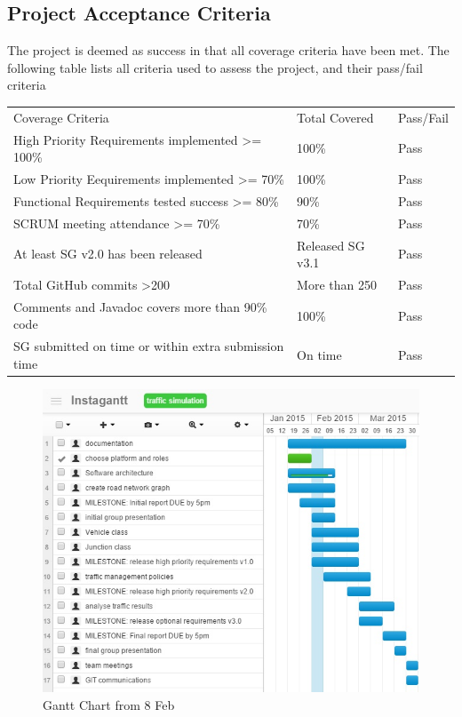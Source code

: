 \documentclass[11pt]{article}
\begin{document}
\begin{enumerate}
\subsection{Project Acceptance Criteria}

The project is deemed as success in that all coverage criteria have been met.
The following table lists all criteria used to assess the project, and their pass/fail criteria

\begin{table}[h]
\begin{tabular}{lll}
Coverage Criteria & Total Covered & Pass/Fail \\
High Priority Requirements implemented \textgreater= 100\% & 100\% & Pass \\
Low Priority Eequirements implemented \textgreater= 70\% & 100\% & Pass \\
Functional Requirements tested success \textgreater= 80\% & 90\% & Pass \\
SCRUM meeting attendance \textgreater= 70\% & 70\% & Pass \\
At least SG v2.0 has been released & Released SG v3.1 & Pass \\
Total GitHub commits \textgreater 200 & More than 250 & Pass \\
Comments and Javadoc covers more than 90\% code & 100\% & Pass \\
SG submitted on time or within extra submission time & On time & Pass
\end{tabular}
\end{table}


\begin{figure}
\begin{center}
\includegraphics[scale=0.65]{gantt8Feb}
\caption{Gantt Chart from 8 Feb}
\end{center}
\end{figure}


\end{enumerate}
\end{document}

